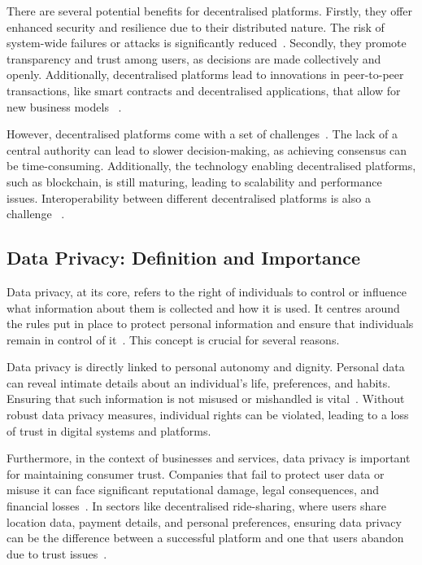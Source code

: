 There are several potential benefits for decentralised platforms. Firstly, they offer enhanced security and resilience due to their distributed nature. The risk of system-wide failures or attacks is significantly reduced~\cite{Maffiola.2022}. Secondly, they promote transparency and trust among users, as decisions are made collectively and openly. Additionally, decentralised platforms lead to innovations in peer-to-peer transactions, like smart contracts and decentralised applications, that allow for new business models ~\cite{Ramachandran2022}.

However, decentralised platforms come with a set of challenges~\cite{Hasan.2022}. The lack of a central authority can lead to slower decision-making, as achieving consensus can be time-consuming. Additionally, the technology enabling decentralised platforms, such as blockchain, is still maturing, leading to scalability and performance issues. Interoperability between different decentralised platforms is also a challenge ~\cite{Zhao2022}.

\subsection{Data Privacy: Definition and Importance}
Data privacy, at its core, refers to the right of individuals to control or influence what information about them is collected and how it is used. It centres around the rules put in place to protect personal information and ensure that individuals remain in control of it~\cite{Covert.2020}. This concept is crucial for several reasons.

Data privacy is directly linked to personal autonomy and dignity. Personal data can reveal intimate details about an individual's life, preferences, and habits. Ensuring that such information is not misused or mishandled is vital~\cite{Covert.2020}. Without robust data privacy measures, individual rights can be violated, leading to a loss of trust in digital systems and platforms.

Furthermore, in the context of businesses and services, data privacy is important for maintaining consumer trust. Companies that fail to protect user data or misuse it can face significant reputational damage, legal consequences, and financial losses~\cite{Li.2019}. In sectors like decentralised ride-sharing, where users share location data, payment details, and personal preferences, ensuring data privacy can be the difference between a successful platform and one that users abandon due to trust issues~\cite{Li.2019}.

